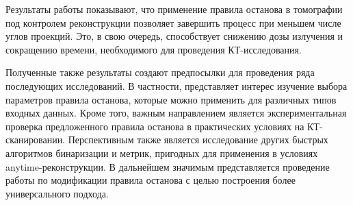 Результаты работы показывают, что применение правила останова в томографии под контролем реконструкции позволяет завершить процесс при меньшем числе углов проекций. Это, в свою очередь, способствует снижению дозы излучения и сокращению времени, необходимого для проведения КТ-исследования.

Полученные также результаты создают предпосылки для проведения ряда последующих исследований. В частности, представляет интерес изучение выбора параметров правила останова, которые можно применить для различных типов входных данных. Кроме того, важным направлением является экспериментальная проверка предложенного правила останова в практических условиях на КТ-сканировании. Перспективным также является исследование других быстрых алгоритмов бинаризации и метрик, пригодных для применения в условиях anytime-реконструкции. В дальнейшем значимым представляется проведение работы по модификации правила останова с целью построения более универсального подхода.